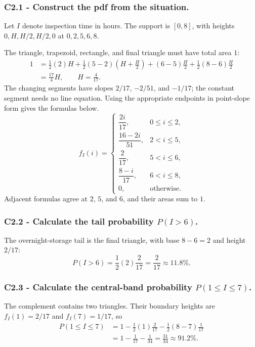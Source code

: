 \subsubsection*{C2.1 - Construct the pdf from the situation.}
\label{subsec:c2-piecewise-linear-inspection-a}
Let $I$ denote inspection time in hours.  The support is $[0,8]$, with heights
$0,H,H/2,H/2,0$ at $0,2,5,6,8$.

The triangle, trapezoid, rectangle, and final
triangle must have total area $1$:
\[
 \begin{aligned}
 1&=\frac12(2)H
 +\frac12(5-2)\left(H+\frac H2\right)
 +(6-5)\frac H2+\frac12(8-6)\frac H2\\
 &=\frac{17}{4}H,
 \qquad H=\frac4{17}.
 \end{aligned}
\]
The changing segments have slopes $2/17$, $-2/51$, and $-1/17$;
the constant segment needs no line equation.  Using the appropriate endpoints
in point-slope form gives the formulas below.
\[
 f_I(i)=\begin{cases}
 \dfrac{2i}{17},&0\le i\le2,\\[1mm]
 \dfrac{16-2i}{51},&2<i\le5,\\[1mm]
 \dfrac2{17},&5<i\le6,\\[1mm]
 \dfrac{8-i}{17},&6<i\le8,\\[1mm]
 0,&\text{otherwise.}
 \end{cases}
\]
Adjacent formulas agree at $2$, $5$, and $6$, and their areas sum to $1$.

\subsubsection*{C2.2 - Calculate the tail probability $P(I>6)$.}
\label{subsec:c2-piecewise-linear-inspection-b}
The overnight-storage tail is the final triangle, with base $8-6=2$ and height
$2/17$:
\[
 P(I>6)=\frac12(2)\frac2{17}=\frac2{17}\approx11.8\%.
\]

\subsubsection*{C2.3 - Calculate the central-band probability
$P(1\le I\le7)$.}
\label{subsec:c2-piecewise-linear-inspection-c}
The complement contains two triangles.  Their boundary heights are
$f_I(1)=2/17$ and $f_I(7)=1/17$, so
\[
 \begin{aligned}
 P(1\le I\le7)
 &=1-\frac12(1)\frac2{17}-\frac12(8-7)\frac1{17}\\
 &=1-\frac1{17}-\frac1{34}=\frac{31}{34}\approx91.2\%.
 \end{aligned}
\]

